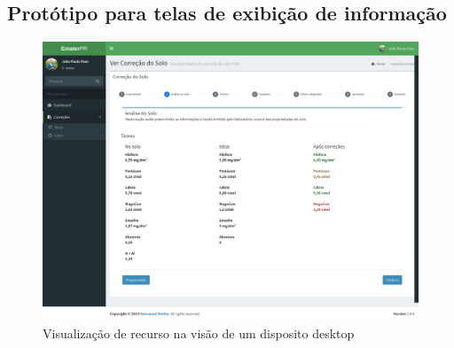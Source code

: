 \subsection{Protótipo para telas de exibição de informação}
\label{sec:titSecPrototiposShow}

\begin{figure}[H]
    \centering
    \includegraphics[width=13cm]{./dados/figuras/prototipos/show_desktop.png}
    \caption{Visualização de recurso na visão de um disposito desktop}
    \label{fig:prototipo_show_desk}
\end{figure}

